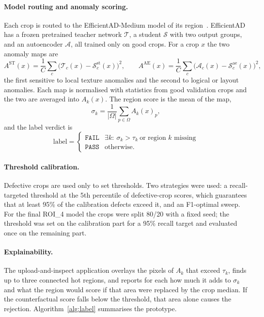 \paragraph{Model routing and anomaly scoring.} Each crop is routed to the EfficientAD-Medium model of its region~\cite{batzner2024}. EfficientAD has a frozen pretrained teacher network $\mathcal{T}$, a student $\mathcal{S}$ with two output groups, and an autoencoder $\mathcal{A}$, all trained only on good crops. For a crop $x$ the two anomaly maps are
\begin{equation}
    A^{\text{ST}}(x) = \frac{1}{C}\sum_{c}\big(\mathcal{T}_c(x)-\mathcal{S}^{\text{st}}_c(x)\big)^2,\qquad
    A^{\text{AE}}(x) = \frac{1}{C}\sum_{c}\big(\mathcal{A}_c(x)-\mathcal{S}^{\text{ae}}_c(x)\big)^2,
\end{equation}
the first sensitive to local texture anomalies and the second to logical or layout anomalies. Each map is normalised with statistics from good validation crops and the two are averaged into $A_k(x)$. The region score is the mean of the map,
\begin{equation}
    \sigma_k = \frac{1}{|\Omega|}\sum_{p\in\Omega} A_k(x)_p ,
    \label{eq:roiscore}
\end{equation}
and the label verdict is
\begin{equation}
    \text{label} = \begin{cases}
    \texttt{FAIL} & \exists k:\ \sigma_k>\tau_k \ \text{or region } k \text{ missing}\\
    \texttt{PASS} & \text{otherwise.}
    \end{cases}
    \label{eq:labelrule}
\end{equation}

\paragraph{Threshold calibration.} Defective crops are used only to set thresholds. Two strategies were used: a recall-targeted threshold at the 5th percentile of defective-crop scores, which guarantees that at least 95\% of the calibration defects exceed it, and an F1-optimal sweep. For the final ROI\_4 model the crops were split 80/20 with a fixed seed; the threshold was set on the calibration part for a 95\% recall target and evaluated once on the remaining part.

\paragraph{Explainability.} The upload-and-inspect application overlays the pixels of $A_k$ that exceed $\tau_k$, finds up to three connected hot regions, and reports for each how much it adds to $\sigma_k$ and what the region would score if that area were replaced by the crop median. If the counterfactual score falls below the threshold, that area alone causes the rejection. Algorithm~\ref{alg:label} summarises the prototype.

